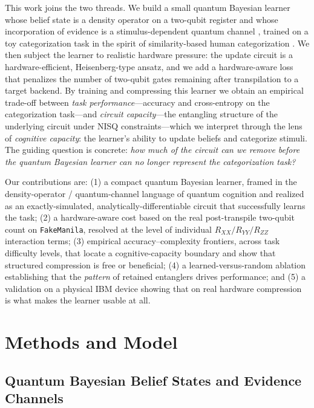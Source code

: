 \documentclass[conference]{IEEEtran}
\begin{document}
This work joins the two threads. We build a small quantum Bayesian learner whose belief
state is a density operator on a two-qubit register and whose incorporation of evidence is
a stimulus-dependent quantum channel \cite{b3,b12,b13}, trained on a toy categorization
task in the spirit of similarity-based human categorization \cite{b19}. We then subject
the learner to realistic hardware pressure: the update circuit is a hardware-efficient,
Heisenberg-type ansatz, and we add a hardware-aware loss that penalizes the number of
two-qubit gates remaining after transpilation to a target backend. By training and
compressing this learner we obtain an empirical trade-off between \emph{task
performance}---accuracy and cross-entropy on the categorization task---and
\emph{circuit capacity}---the entangling structure of the underlying circuit under NISQ
constraints---which we interpret through the lens of \emph{cognitive capacity}: the
learner's ability to update beliefs and categorize stimuli. The guiding question is concrete: \emph{how much of the circuit can we remove
before the quantum Bayesian learner can no longer represent the categorization task?}

Our contributions are: (1) a compact quantum Bayesian learner, framed in the
density-operator / quantum-channel language of quantum cognition and realized as an
exactly-simulated, analytically-differentiable circuit that successfully learns the task;
(2) a hardware-aware cost based on the real post-transpile two-qubit count on
\texttt{FakeManila}, resolved at the level of individual $R_{XX}/R_{YY}/R_{ZZ}$
interaction terms; (3) empirical accuracy--complexity frontiers, across task difficulty
levels, that locate a cognitive-capacity boundary and show that structured compression is
free or beneficial; (4) a learned-versus-random ablation establishing that the
\emph{pattern} of retained entanglers drives performance; and (5) a validation on a
physical IBM device showing that on real hardware compression is what makes the learner
usable at all.

\section{Methods and Model}

\subsection{Quantum Bayesian Belief States and Evidence Channels}
\end{document}
